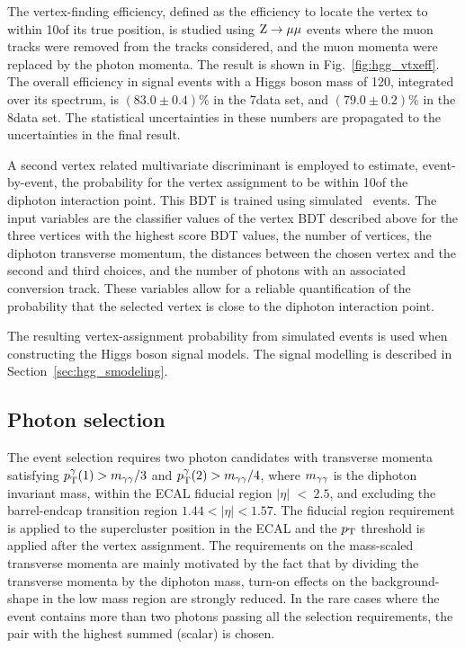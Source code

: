 \documentclass[11pt,twoside,a4paper,cmspaper,final,collab]{cms-tdr}
\begin{document}
The vertex-finding efficiency, defined as the efficiency to locate the vertex to
within 10\mm of its true position, is studied using $\mathrm{Z}\to\mu\mu$
events where the muon tracks were removed from the tracks considered,
and the muon momenta were replaced by the photon momenta.
The result
is shown in Fig.~\ref{fig:hgg_vtxeff}. The overall efficiency in signal events
with a Higgs boson mass of 120\GeV, integrated over its \pt spectrum, is
$(83.0\pm0.4)\%$ in the 7\TeV data set, and
$(79.0\pm0.2)\%$ in the 8\TeV data set. The statistical uncertainties in
these numbers are propagated to the uncertainties in the final result.

A second vertex related multivariate discriminant is employed to
estimate, event-by-event, the probability for the vertex
assignment to be within 10\mm of the diphoton interaction point.
This BDT is trained using simulated \HGG\ events. The input variables are
the classifier values of the vertex BDT described above for the three vertices with the highest score BDT values,
the number of vertices, the diphoton transverse momentum,
the distances between the chosen vertex and the second and third choices,
and the number of photons with an associated conversion track.
These variables allow for a reliable quantification of the probability
that the selected vertex is close to the diphoton interaction point.

The resulting  vertex-assignment probability from simulated events is used when constructing the Higgs boson signal models.
The signal modelling is described in Section~\ref{sec:hgg_smodeling}.

\subsection{Photon selection}
\label{sec:hgg_selection}

The event selection requires two photon candidates with transverse momenta satisfying
$p_{\mathrm{T}}^{\gamma}(1) > m_{\gamma\gamma}/3$ and $p_{\mathrm{T}}^{\gamma}(2) > m_{\gamma\gamma}/4$, where $m_{\gamma\gamma}$ is the diphoton invariant mass,
within the ECAL fiducial region $|\eta|$ $<~2.5$, and excluding the
barrel-endcap transition region $1.44 < |\eta| < 1.57$.
The fiducial region requirement  is applied to the supercluster position in the ECAL
and the $p_{\mathrm{T}}$ threshold is applied after the vertex assignment.
The requirements on the mass-scaled transverse momenta are mainly motivated by the fact
that by dividing the transverse momenta by the diphoton mass,
turn-on effects on the background-shape in the low mass region are strongly reduced.
In the rare cases where the event contains more than two photons
passing all the selection requirements, the pair with the highest summed
(scalar) \pt is chosen.
\end{document}
